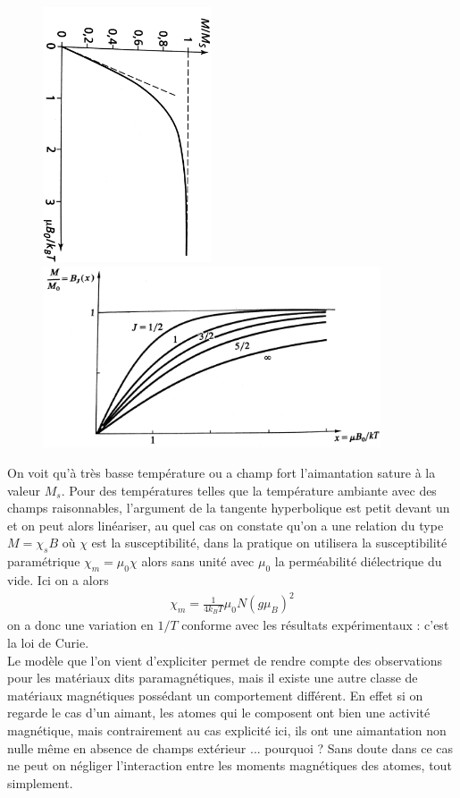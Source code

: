 \documentclass[12pt,prb,aps,epsf]{article}
\begin{document}
\begin{figure}[h]
	\centerline{\includegraphics[width=5cm,angle=90]{para}
				\includegraphics[width=10cm]{cas_j_n0,5}}
				
\end{figure}

On voit qu'à très basse température ou a champ fort l'aimantation sature à la valeur $M_s$. Pour des températures telles que la température ambiante avec des champs raisonnables, l'argument de la tangente hyperbolique est petit devant un et on peut alors linéariser, au quel cas on constate qu'on a une relation du type $M = \chi_sB$ où $\chi$ est la susceptibilité, dans la pratique on utilisera la susceptibilité paramétrique $\chi_m= \mu_0\chi$ alors sans unité avec $\mu_0$ la perméabilité diélectrique du vide. Ici on a alors 
\begin{eqnarray}
\chi_m = \frac{1}{4k_BT}\mu_0 N(g\mu_B)^2
\end{eqnarray}
on a donc une variation en $1/T$ conforme avec les résultats expérimentaux : c'est la loi de Curie.\\

Le modèle que l'on vient d'expliciter permet de rendre compte des observations pour les matériaux dits paramagnétiques, mais il existe une autre classe de matériaux magnétiques possédant un comportement différent. En effet si on regarde le cas d'un aimant, les atomes qui le composent ont bien une activité magnétique, mais contrairement au cas explicité ici, ils ont une aimantation non nulle même en absence de champs extérieur ... pourquoi ? Sans doute dans ce cas ne peut on négliger l'interaction entre les moments magnétiques des atomes, tout simplement.
\end{document}
